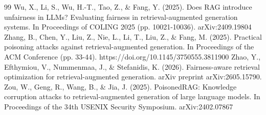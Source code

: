 \documentclass[authoryear,review,3p,times]{elsarticle}
\begin{document}
\begin{thebibliography}{99}
 Wu, X., Li, S., Wu, H.-T., Tao, Z., \& Fang, Y. (2025). Does RAG introduce unfairness in LLMs? Evaluating fairness in retrieval-augmented generation systems. In Proceedings of COLING 2025 (pp. 10021-10036). arXiv:2409.19804
 Zhang, B., Chen, Y., Liu, Z., Nie, L., Li, T., Liu, Z., \& Fang, M. (2025). Practical poisoning attacks against retrieval-augmented generation. In Proceedings of the ACM Conference (pp. 33-44). https://doi.org/10.1145/3750555.3811900
 Zhao, Y., Efthymiou, V., Nummenmaa, J., \& Stefanidis, K. (2026). Fairness-aware retrieval optimization for retrieval-augmented generation. arXiv preprint arXiv:2605.15790.
 Zou, W., Geng, R., Wang, B., \& Jia, J. (2025). PoisonedRAG: Knowledge corruption attacks to retrieval-augmented generation of large language models. In Proceedings of the 34th USENIX Security Symposium. arXiv:2402.07867
\end{thebibliography}
\end{document}
